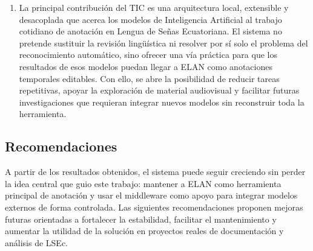 \begin{enumerate}
    \item La principal contribución del TIC es una arquitectura local, extensible y desacoplada que acerca los modelos de Inteligencia Artificial al trabajo cotidiano de anotación en Lengua de Señas Ecuatoriana. El sistema no pretende sustituir la revisión lingüística ni resolver por sí solo el problema del reconocimiento automático, sino ofrecer una vía práctica para que los resultados de esos modelos puedan llegar a ELAN como anotaciones temporales editables. Con ello, se abre la posibilidad de reducir tareas repetitivas, apoyar la exploración de material audiovisual y facilitar futuras investigaciones que requieran integrar nuevos modelos sin reconstruir toda la herramienta.
\end{enumerate}

\vspace{1\baselineskip}

\subsection{Recomendaciones}

A partir de los resultados obtenidos, el sistema puede seguir creciendo sin perder la idea central que guio este trabajo: mantener a ELAN como herramienta principal de anotación y usar el middleware como apoyo para integrar modelos externos de forma controlada. Las siguientes recomendaciones proponen mejoras futuras orientadas a fortalecer la estabilidad, facilitar el mantenimiento y aumentar la utilidad de la solución en proyectos reales de documentación y análisis de LSEc.

